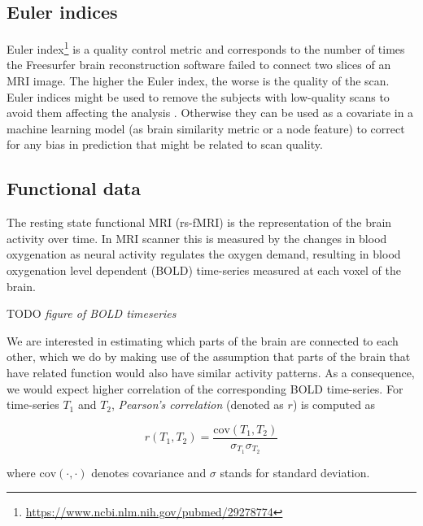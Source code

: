 \subsection{Euler indices}
Euler index\footnote{\url{https://www.ncbi.nlm.nih.gov/pubmed/29278774}} is a quality control metric and corresponds to the number of times the Freesurfer brain reconstruction software failed to connect two slices of an MRI image. The higher the Euler index, the worse is the quality of the scan. Euler indices might be used to remove the subjects with low-quality scans to avoid them affecting the analysis \cite{kaufmann2019}. Otherwise they can be used as a covariate in a machine learning model (as brain similarity metric or a node feature) to correct for any bias in prediction that might be related to scan quality.

\subsection{Functional data}
The resting state functional MRI (rs-fMRI) is the representation of the brain activity over time. In MRI scanner this is measured by the changes in blood oxygenation as neural activity regulates the oxygen demand, resulting in blood oxygenation level dependent (BOLD) time-series measured at each voxel of the brain.

TODO \textit{figure of BOLD timeseries}

We are interested in estimating which parts of the brain are connected to each other, which we do by making use of the assumption that parts of the brain that have related function would also have similar activity patterns. As a consequence, we would expect higher correlation of the corresponding BOLD time-series. For time-series $T_1$ and $T_2$, \textit{Pearson's correlation} (denoted as $r$) is computed as

\begin{equation}
    r(T_1, T_2) = \frac{\mathrm{cov}(T_1, T_2)}{\sigma_{T_1} \sigma_{T_2}}
\end{equation}

where $\mathrm{cov}(\cdot, \cdot)$ denotes covariance and $\sigma$ stands for standard deviation.

